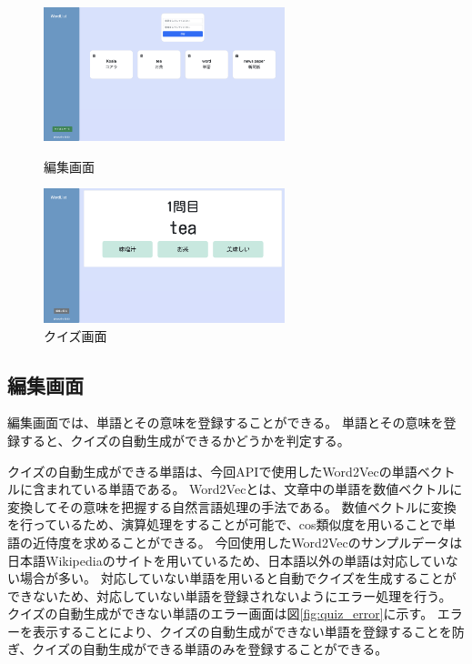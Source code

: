 \documentclass[11pt,a4paper]{jsarticle}
\begin{document}
\begin{figure}[htbp]
    \begin{minipage}{0.5\hsize}
        \begin{center}
            \includegraphics[width=70mm]{./img/edit_screen.png}

        \end{center}
        \caption{編集画面}
        \label{fig:edit_screen}
    \end{minipage}
    \begin{minipage}{0.5\hsize}
        \begin{center}
            \includegraphics[width=70mm]{./img/quiz_screen.png}
        \end{center}
        \caption{クイズ画面}
        \label{fig:quiz_screen}
    \end{minipage}
\end{figure}

\subsection{編集画面}
編集画面では、単語とその意味を登録することができる。
単語とその意味を登録すると、クイズの自動生成ができるかどうかを判定する。

クイズの自動生成ができる単語は、今回APIで使用したWord2Vecの単語ベクトルに含まれている単語である。
Word2Vecとは、文章中の単語を数値ベクトルに変換してその意味を把握する自然言語処理の手法である。
数値ベクトルに変換を行っているため、演算処理をすることが可能で、cos類似度を用いることで単語の近侍度を求めることができる。
今回使用したWord2Vecのサンプルデータは日本語Wikipediaのサイトを用いているため、日本語以外の単語は対応していない場合が多い。
対応していない単語を用いると自動でクイズを生成することができないため、対応していない単語を登録されないようにエラー処理を行う。
クイズの自動生成ができない単語のエラー画面は図\ref{fig:quiz_error}に示す。
エラーを表示することにより、クイズの自動生成ができない単語を登録することを防ぎ、クイズの自動生成ができる単語のみを登録することができる。
\end{document}
